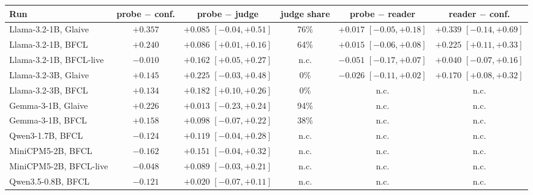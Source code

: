 \begin{tabular}{@{}lccccc@{}}
\toprule
Run & probe $-$ conf. & probe $-$ judge & judge share & probe $-$ reader & reader $-$ conf. \\
\midrule
Llama-3.2-1B, Glaive & $+0.357$ & $+0.085$ {\scriptsize$[-0.04, +0.51]$} & 76\% & $+0.017$ {\scriptsize$[-0.05, +0.18]$} & $+0.339$ {\scriptsize$[-0.14, +0.69]$} \\
Llama-3.2-1B, BFCL & $+0.240$ & $+0.086$ {\scriptsize$[+0.01, +0.16]$} & 64\% & $+0.015$ {\scriptsize$[-0.06, +0.08]$} & $+0.225$ {\scriptsize$[+0.11, +0.33]$} \\
Llama-3.2-1B, BFCL-live & $-0.010$ & $+0.162$ {\scriptsize$[+0.05, +0.27]$} & n.c. & $-0.051$ {\scriptsize$[-0.17, +0.07]$} & $+0.040$ {\scriptsize$[-0.07, +0.16]$} \\
Llama-3.2-3B, Glaive & $+0.145$ & $+0.225$ {\scriptsize$[-0.03, +0.48]$} & 0\% & $-0.026$ {\scriptsize$[-0.11, +0.02]$} & $+0.170$ {\scriptsize$[+0.08, +0.32]$} \\
Llama-3.2-3B, BFCL & $+0.134$ & $+0.182$ {\scriptsize$[+0.10, +0.26]$} & 0\% & n.c. & n.c. \\
Gemma-3-1B, Glaive & $+0.226$ & $+0.013$ {\scriptsize$[-0.23, +0.24]$} & 94\% & n.c. & n.c. \\
Gemma-3-1B, BFCL & $+0.158$ & $+0.098$ {\scriptsize$[-0.07, +0.22]$} & 38\% & n.c. & n.c. \\
Qwen3-1.7B, BFCL & $-0.124$ & $+0.119$ {\scriptsize$[-0.04, +0.28]$} & n.c. & n.c. & n.c. \\
MiniCPM5-2B, BFCL & $-0.162$ & $+0.151$ {\scriptsize$[-0.04, +0.32]$} & n.c. & n.c. & n.c. \\
MiniCPM5-2B, BFCL-live & $-0.048$ & $+0.089$ {\scriptsize$[-0.03, +0.21]$} & n.c. & n.c. & n.c. \\
Qwen3.5-0.8B, BFCL & $-0.121$ & $+0.020$ {\scriptsize$[-0.07, +0.11]$} & n.c. & n.c. & n.c. \\
\bottomrule
\end{tabular}
